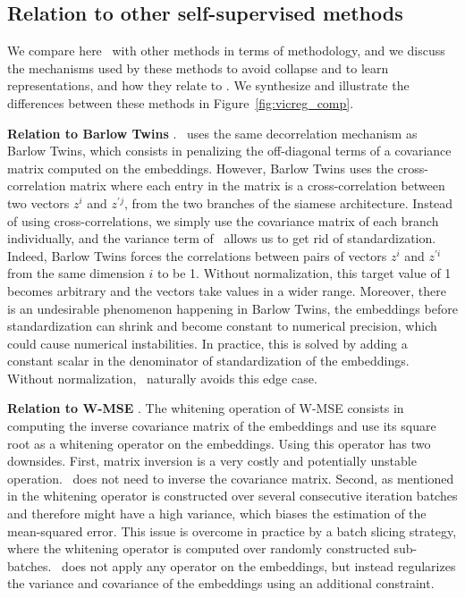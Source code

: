 \newpage

\subsection{Relation to other self-supervised methods}

We compare here \algo \ with other methods in terms of methodology, and we discuss the mechanisms used by these methods to avoid collapse and to learn representations, and how they relate to \algo. We synthesize and illustrate the differences between these methods in Figure~\ref{fig:vicreg_comp}. 

\vspace{2mm}
\textbf{Relation to Barlow Twins} \cite{zbontar2021barlow}. \algo \ uses the same decorrelation mechanism as Barlow Twins, which consists in penalizing the off-diagonal terms of a covariance matrix computed on the embeddings. However, Barlow Twins uses the cross-correlation matrix where each entry in the matrix is a cross-correlation between two vectors $z^{i}$ and $z^{\prime j}$, from the two branches of the siamese architecture. Instead of using cross-correlations, we simply use the covariance matrix of each branch individually, and the variance term of \algo \ allows us to get rid of standardization. Indeed, Barlow Twins forces the correlations between pairs of vectors $z^{i}$ and $z^{\prime i}$ from the same dimension $i$ to be 1. Without normalization, this target value of 1 becomes arbitrary and the vectors take values in a wider range. Moreover, there is an undesirable phenomenon happening in Barlow Twins, the embeddings before standardization can shrink and become constant to numerical precision, which could cause numerical instabilities. In practice, this is solved by adding a constant scalar in the denominator of standardization of the embeddings. Without normalization, \algo \ naturally avoids this edge case.

\vspace{2mm}
\textbf{Relation to W-MSE} \cite{ermolov2021whitening}. The whitening operation of W-MSE consists in computing the inverse covariance matrix of the embeddings and use its square root as a whitening operator on the embeddings. Using this operator has two downsides. First, matrix inversion is a very costly and potentially unstable operation. \algo \ does not need to inverse the covariance matrix. Second, as mentioned in \cite{ermolov2021whitening} the whitening operator is constructed over several consecutive iteration batches and therefore might have a high variance, which biases the estimation of the mean-squared error. This issue is overcome in practice by a batch slicing strategy, where the whitening operator is computed over randomly constructed sub-batches. \algo \ does not apply any operator on the embeddings, but instead regularizes the variance and covariance of the embeddings using an additional constraint.


